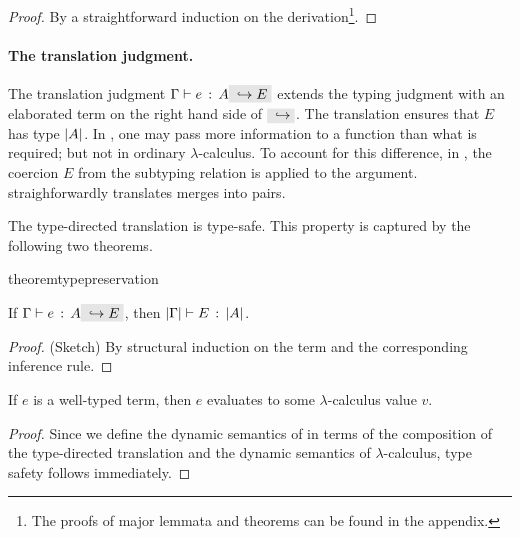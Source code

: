 \begin{proof}
  By a straightforward induction on the derivation\footnote{The proofs of major lemmata and theorems can be found in the appendix.}.
\end{proof}

\paragraph{The translation judgment.} The translation judgment $\jtype \Gamma e
A \yields E$ extends the typing judgment with an elaborated term on the right
hand side of $\yields {}$. The translation ensures that $E$ has type $\lvert A \rvert$. In
\name, one may pass more information to a function than what is required; but
not in ordinary $\lambda$-calculus. To account for this difference, in , the
coercion $E$ from the subtyping relation is applied to the argument.
 straighforwardly translates merges into pairs.

The type-directed translation is type-safe. This property is captured
by the following two theorems.

\begin{restatable}{theorem}{typepreservation}
  \label{theorem:type-preservation}

  If $ \jtype \Gamma e A \yields E $,
  then $ \lvert \Gamma \rvert \vdash E \ \!:\! \ \lvert A \rvert $.
\end{restatable}

\begin{proof}
  (Sketch) By structural induction on the term and the corresponding
  inference rule.
\end{proof}

\begin{theorem}
  If $e$ is a well-typed \name term, then $e$ evaluates to some $\lambda$-calculus
  value $v$.
\end{theorem}

\begin{proof}
  Since we define the dynamic semantics of \name in terms of the composition of
  the type-directed translation and the dynamic semantics of $\lambda$-calculus, type safety follows immediately.
\end{proof}
